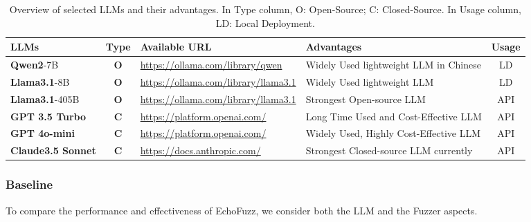 \documentclass[sigconf]{acmart}
\newcommand{\ToolName}{\textcolor{ToolNameColor}{\textsf{{EchoFuzz}}}}
\begin{document}
\begin{sloppypar}
\begin{table}[h]
\vspace{-5pt}
\centering
\caption{\small Overview of selected LLMs and their advantages. In Type column, O: Open-Source; C: Closed-Source. In Usage column, LD: Local Deployment.}
\vspace{-10pt}
\label{tab:llm-choosing}
{\fontsize{4.8}{6.2}\selectfont 
\setlength{\tabcolsep}{3pt}%
\renewcommand{\arraystretch}{0.9}%
\setlength{\heavyrulewidth}{0.08em}    %
\setlength{\lightrulewidth}{0.05em}    %
\setlength{\belowrulesep}{0.6ex}       %
\setlength{\aboverulesep}{0.6ex}       %
\begin{tabular}{l c l l c}  %
    \toprule
    \textbf{LLMs} & \textbf{Type} & \textbf{Available URL} & \textbf{Advantages} & \textbf{Usage} \\
    \midrule
    \textbf{Qwen2}-7B         & \textbf{O}   & \url{https://ollama.com/library/qwen}               & Widely Used lightweight LLM in Chinese    & LD \\
    \textbf{Llama3.1}-8B      & \textbf{O}   & \url{https://ollama.com/library/llama3.1}           & Widely Used lightweight LLM               & LD \\
    \textbf{Llama3.1}-405B    & \textbf{O}   & \url{https://ollama.com/library/llama3.1}           & Strongest Open-source LLM                 & API              \\
    \textbf{GPT 3.5 Turbo}    & \textbf{C} & \url{https://platform.openai.com/} & Long Time Used and Cost-Effective LLM     & API              \\
    \textbf{GPT 4o-mini}      & \textbf{C} & \url{https://platform.openai.com/}   & Widely Used, Highly Cost-Effective LLM & API              \\
    \textbf{Claude3.5 Sonnet} & \textbf{C} & \url{https://docs.anthropic.com/}                   & Strongest Closed-source LLM currently     & API              \\
    \bottomrule
\end{tabular}%
}
\vspace{-10pt}
\end{table}




 
\subsubsection{Baseline}
To compare the performance and effectiveness of \ToolName{}, we consider both the LLM and the Fuzzer aspects.


\end{sloppypar}
\end{document}

